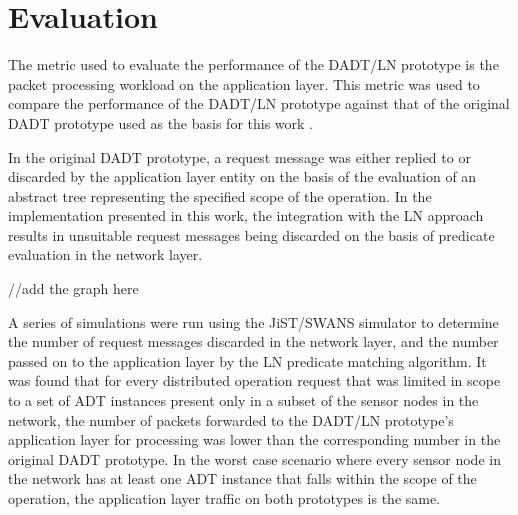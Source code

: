 \chapter{Evaluation} \label{chap: Evaluation}


The metric used to evaluate the performance of the DADT/LN prototype is
the packet processing workload on the application layer. This metric was used to
compare the performance of the DADT/LN prototype against that of the original
DADT prototype used as the basis for this work \cite{migliavacca_DADT:2006}. 

In the original DADT prototype, a request message
was either replied to or discarded by the application layer entity on the basis of the
evaluation of an abstract tree representing the specified scope of the operation. In
the implementation presented in this work, the integration with the LN approach
results in unsuitable request messages being discarded on the basis of predicate
evaluation in the network layer.

//add the graph here

A series of simulations were run using the JiST/SWANS simulator to determine
the number of request messages discarded in the network layer, and the number
passed on to the application layer by the LN predicate matching algorithm. 
It was found that for every distributed operation request that was limited in
scope to a set of ADT instances present only in a subset of the sensor nodes in
the network, the number of packets forwarded to the DADT/LN prototype's
application layer for processing was lower than the corresponding number in the
original DADT prototype. In the worst case scenario where every sensor node in
the network has at least one ADT instance that falls within the scope of the
operation, the application layer traffic on both prototypes is the same.

